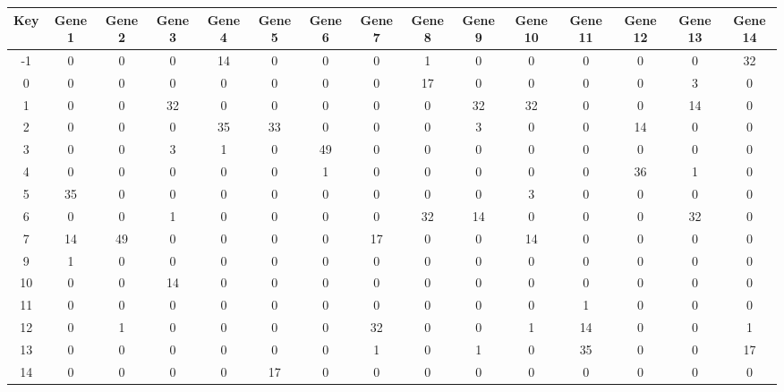 \begin{tabular}{|c|c|c|c|c|c|c|c|c|c|c|c|c|c|c|}
\hline
Key & Gene 1 & Gene 2 & Gene 3 & Gene 4 & Gene 5 & Gene 6 & Gene 7 & Gene 8 & Gene 9 & Gene 10 & Gene 11 & Gene 12 & Gene 13 & Gene 14 \\
\hline
-1 & 0 & 0 & 0 & 14 & 0 & 0 & 0 & 1 & 0 & 0 & 0 & 0 & 0 & 32 \\
0 & 0 & 0 & 0 & 0 & 0 & 0 & 0 & 17 & 0 & 0 & 0 & 0 & 3 & 0 \\
1 & 0 & 0 & 32 & 0 & 0 & 0 & 0 & 0 & 32 & 32 & 0 & 0 & 14 & 0 \\
2 & 0 & 0 & 0 & 35 & 33 & 0 & 0 & 0 & 3 & 0 & 0 & 14 & 0 & 0 \\
3 & 0 & 0 & 3 & 1 & 0 & 49 & 0 & 0 & 0 & 0 & 0 & 0 & 0 & 0 \\
4 & 0 & 0 & 0 & 0 & 0 & 1 & 0 & 0 & 0 & 0 & 0 & 36 & 1 & 0 \\
5 & 35 & 0 & 0 & 0 & 0 & 0 & 0 & 0 & 0 & 3 & 0 & 0 & 0 & 0 \\
6 & 0 & 0 & 1 & 0 & 0 & 0 & 0 & 32 & 14 & 0 & 0 & 0 & 32 & 0 \\
7 & 14 & 49 & 0 & 0 & 0 & 0 & 17 & 0 & 0 & 14 & 0 & 0 & 0 & 0 \\
9 & 1 & 0 & 0 & 0 & 0 & 0 & 0 & 0 & 0 & 0 & 0 & 0 & 0 & 0 \\
10 & 0 & 0 & 14 & 0 & 0 & 0 & 0 & 0 & 0 & 0 & 0 & 0 & 0 & 0 \\
11 & 0 & 0 & 0 & 0 & 0 & 0 & 0 & 0 & 0 & 0 & 1 & 0 & 0 & 0 \\
12 & 0 & 1 & 0 & 0 & 0 & 0 & 32 & 0 & 0 & 1 & 14 & 0 & 0 & 1 \\
13 & 0 & 0 & 0 & 0 & 0 & 0 & 1 & 0 & 1 & 0 & 35 & 0 & 0 & 17 \\
14 & 0 & 0 & 0 & 0 & 17 & 0 & 0 & 0 & 0 & 0 & 0 & 0 & 0 & 0 \\
\hline
\end{tabular}